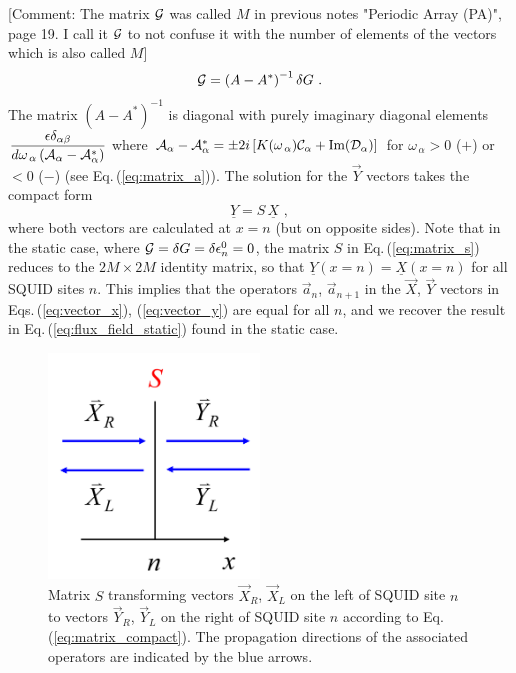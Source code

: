 [Comment: The matrix ${\cal G}$ was called $M$ in previous notes "Periodic Array (PA)", page 19. 
I call it ${\cal G}$ to not confuse it with the number of elements of the vectors which is 
also called $M$]
\color{black}
%
\begin{equation} \label{eq:matrix_G}
{\cal G} = \left( A - A^* \right)^{-1} \delta G \, \, .
\end{equation}
%
The matrix $\left( A - A^* \right)^{-1}$ is diagonal with purely imaginary diagonal elements 
$\displaystyle{\frac{\epsilon \delta_{\alpha \beta}}{d \omega_{\,\alpha} \left({\cal{A}}_{\alpha}
- {\cal{A}}_{\alpha}^* \right)}}$
where \newline
${\cal A}_{\alpha} - {\cal A}_{\alpha}^* = \pm 2 i \left[ K(\omega_{\,\alpha}) {\cal C}_{\alpha} 
+ \text{Im}( {\cal D}_{\alpha}) \right]$ for $\omega_{\,\alpha} > 0$ ($+$) or $<0$ ($-$) 
(see Eq.\,(\ref{eq:matrix_a})). 
%
The solution for the $\vec{Y}$ vectors takes the compact form
%
\begin{equation} \label{eq:matrix_compact}
    \underline{Y} = S \, \underline{X} \, \, ,
\end{equation}
%
where both vectors are calculated at $x=n$ (but on opposite sides).
Note that in the static case, where ${\cal G} = \delta G = \delta \epsilon_n^0 = 0$,
the matrix
$S$ in Eq.\,(\ref{eq:matrix_s}) reduces to the $2M \times 2M$ identity matrix,
so that $\underline{Y}(x=n) = \underline{X}(x=n)$ for all SQUID sites $n$. 
This implies that the operators $\vec{a}_n$, $\vec{a}_{n+1}$ 
in the $\vec{X}$, $\vec{Y}$ vectors in Eqs.\,(\ref{eq:vector_x}), (\ref{eq:vector_y})
are equal for all $n$, and we recover the result in Eq.\,(\ref{eq:flux_field_static})
found in the static case. 

\begin{figure}
    \includegraphics[width=0.5\textwidth, keepaspectratio]{figures/system/xy.png}
    \caption{Matrix $S$ transforming vectors $\vec{X}_R$, $\vec{X}_L$ on the left of SQUID site $n$
    to vectors $\vec{Y}_R$, $\vec{Y}_L$ on the right of SQUID site $n$ according to 
    Eq.\,(\ref{eq:matrix_compact}). The propagation directions of the associated operators  
    are indicated by the blue arrows.}
    \label{fig:xy}
\end{figure}

